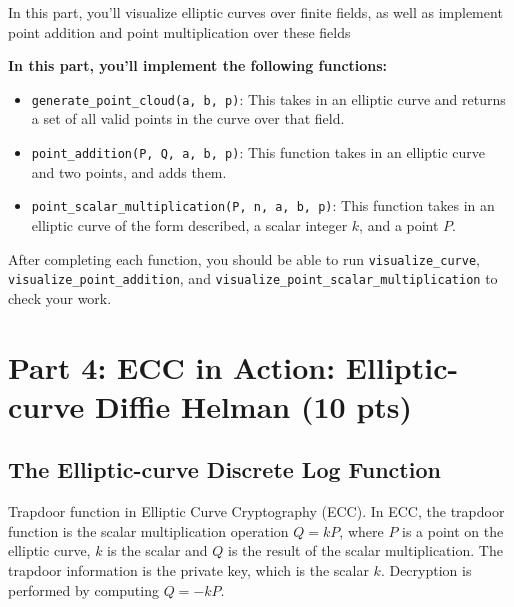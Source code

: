 \documentclass{article}
\begin{document}
    \begin{tcolorbox}[enhanced,interior style={top color=Plum!20,bottom color=Plum!40}]
        In this part, you'll visualize elliptic curves over finite fields, as well as implement point addition and point multiplication over these fields
    
        \textbf{In this part, you'll implement the following functions:}
        \begin{itemize}
            \item \lstinline{generate_point_cloud(a, b, p)}: This takes in an elliptic curve and returns a set of all valid points in the curve over that field.
            \item \lstinline{point_addition(P, Q, a, b, p)}: This function takes in an elliptic curve and two points, and adds them.
            \item \lstinline{point_scalar_multiplication(P, n, a, b, p)}: This function takes in an elliptic curve of the form described, a scalar integer $k$, and a point $P$.
        \end{itemize}
        After completing each function, you should be able to run \lstinline{visualize_curve}, \lstinline{visualize_point_addition}, and \lstinline{visualize_point_scalar_multiplication} to check your work.
    \end{tcolorbox}

\section*{Part 4: ECC in Action: Elliptic-curve Diffie Helman (10 pts)}



\subsection*{The Elliptic-curve Discrete Log Function}



    \vspace{3mm}
    Trapdoor function in Elliptic Curve Cryptography (ECC). In ECC, the trapdoor function is the scalar multiplication operation $Q = kP$, where $P$ is a point on the elliptic curve, $k$ is the scalar and $Q$ is the result of the scalar multiplication. The trapdoor information is the private key, which is the scalar $k$. Decryption is performed by computing $Q = -kP$.
\end{document}
